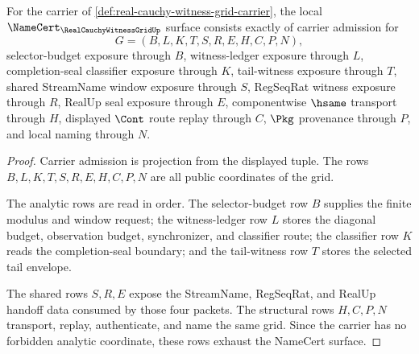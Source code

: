 \begin{theorem}
\label{thm:real-cauchy-witness-grid-namecert-obligations}
For the carrier of \autoref{def:real-cauchy-witness-grid-carrier}, the local $\NameCert_{\RealCauchyWitnessGridUp}$ surface consists exactly of carrier admission for
$$
G=(B,L,K,T,S,R,E,H,C,P,N),
$$
selector-budget exposure through $B$, witness-ledger exposure through $L$, completion-seal classifier exposure through $K$, tail-witness exposure through $T$, shared StreamName window exposure through $S$, RegSeqRat witness exposure through $R$, RealUp seal exposure through $E$, componentwise $\hsame$ transport through $H$, displayed $\Cont$ route replay through $C$, $\Pkg$ provenance through $P$, and local naming through $N$.
\end{theorem}
\begin{proof}
Carrier admission is projection from the displayed tuple. The rows $B,L,K,T,S,R,E,H,C,P,N$ are all public coordinates of the grid.

The analytic rows are read in order. The selector-budget row $B$ supplies the finite modulus and window request; the witness-ledger row $L$ stores the diagonal budget, observation budget, synchronizer, and classifier route; the classifier row $K$ reads the completion-seal boundary; and the tail-witness row $T$ stores the selected tail envelope.

The shared rows $S,R,E$ expose the StreamName, RegSeqRat, and RealUp handoff data consumed by those four packets. The structural rows $H,C,P,N$ transport, replay, authenticate, and name the same grid. Since the carrier has no forbidden analytic coordinate, these rows exhaust the NameCert surface.
\end{proof}

